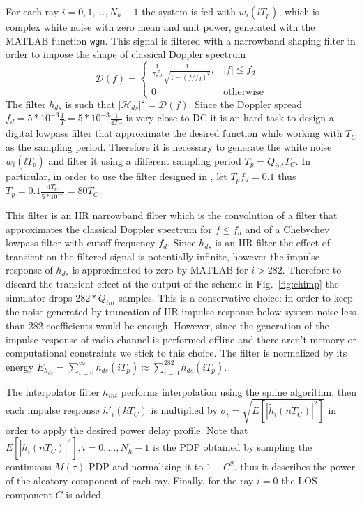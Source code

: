 \documentclass[10pt]{article}
\begin{document}
For each ray $i = 0, 1, \dots, N_h -1$ the system is fed with $w_i(lT_p)$, which is complex white noise with zero mean and unit power, generated with the MATLAB function \texttt{wgn}. This signal is filtered with a narrowband shaping filter in order to impose the shape of classical Doppler spectrum
\begin{equation}
  \mathcal{D}(f) =  \begin{cases} \frac{1}{\pi f_d} \frac{1}{\sqrt{1-(f/f_d)^2}}, & |f| \le f_d \\
                                  0                                              & \mbox{otherwise}
                   \end{cases}
\end{equation}
The filter $h_{ds}$ is such that $|\mathcal{H}_{ds}|^2 = \mathcal{D}(f)$. Since the Doppler spread $f_d = 5*10^{-3}\frac{1}{T} = 5*10^{-3}\frac{1}{4T_C}$ is very close to DC it is an hard task to design a digital lowpass filter that approximate the desired function while working with $T_C$ as the sampling period. Therefore it is necessary to generate the white noise $w_i(lT_p)$ and filter it using a different sampling period $T_p = Q_{int}T_C$. In particular, in order to use the filter designed in \cite{anachugg}, let $T_p f_d = 0.1$ thus $T_p = 0.1 \frac{4 T_C}{5*10^{-3}} = 80 T_C$.

This filter is an IIR narrowband filter which is the convolution of a filter that approximates the classical Doppler spectrum for $f \le f_d$ and of a Chebychev lowpass filter with cutoff frequency $f_d$. Since $h_{ds}$ is an IIR filter the effect of transient on the filtered signal is potentially infinite, however the impulse response of $h_{ds}$ is approximated to zero by MATLAB for $i > 282$. Therefore to discard the transient effect at the output of the scheme in Fig.~\ref{fig:chimp} the simulator drops $282*Q_{int}$ samples. This is a conservative choice: in order to keep the noise generated by truncation of IIR impulse response below system noise less than 282 coefficients would be enough. However, since the generation of the impulse response of radio channel is performed offline and there aren't memory or computational constraints we stick to this choice. The filter is normalized by its energy $E_{h_{ds}} = \sum_{i = 0}^{\infty} h_{ds} (iT_p) \approx \sum_{i = 0}^{282} h_{ds} (iT_p)$.

The interpolator filter $h_{int}$ performs interpolation using the spline algorithm, then each impulse response $h'_i(kT_C)$ is multiplied by $\sigma_i = \sqrt{E[|\tilde{h}_i(nT_C)|^2]}$ in order to apply the desired power delay profile. Note that $E[|\tilde{h}_i(nT_C)|^2], i=0,\dots,N_h -1$ is the PDP obtained by sampling the continuous $M(\tau)$ PDP and normalizing it to $1-C^2$, thus it describes the power of the aleatory component of each ray. Finally, for the ray $i = 0$ the LOS component $C$ is added.
\end{document}
